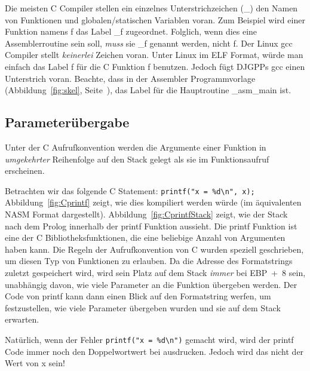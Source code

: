 Die meisten C Compiler stellen ein einzelnes Unterstrichzeichen
({\code \_}) den Namen von Funktionen und globalen/statischen
Variablen voran. Zum Beispiel wird einer Funktion namens {\code f}
das Label {\code \_f} zugeordnet. Folglich, wenn dies eine
Assemblerroutine sein soll, \emph{muss} sie {\code \_f} genannt
werden, nicht {\code f}. Der Linux gcc Compiler 
stellt \emph{keinerlei} Zeichen voran. Unter Linux im ELF Format,
w\"{u}rde man einfach das Label {\code f} f\"{u}r die C Funktion {\code f}
benutzen. Jedoch f\"{u}gt DJGPPs  gcc einen
Unterstrich voran. Beachte, dass in der Assembler Programmvorlage
(Abbildung~\ref{fig:skel}, Seite~\pageref{fig:skel}), das Label f\"{u}r
die Hauptroutine {\code \_asm\_main} ist.

\subsection{Parameter\"{u}bergabe}
Unter der C Aufrufkonvention werden die Argumente einer Funktion in
\emph{umgekehrter} Reihenfolge auf den Stack gelegt als sie im
Funktionsaufruf erscheinen.

Betrachten wir das folgende C Statement: \verb|printf("x = %d\n", x);|
 Abbildung~\ref{fig:Cprintf} zeigt, wie dies
kompiliert werden w\"{u}rde (im \"{a}quivalenten NASM 
Format dargestellt). Abbildung~\ref{fig:CprintfStack} zeigt, wie der
Stack nach dem Prolog  innerhalb der
{\code printf} Funktion aussieht. Die {\code printf} Funktion ist
eine der C Bibliotheksfunktionen, die eine beliebige Anzahl von
Argumenten haben kann. Die Regeln der Aufrufkonvention von C wurden
speziell geschrieben,  um diesen Typ von Funktionen zu erlauben.
Da die Adresse des Formatstrings zuletzt gespeichert wird, wird sein
Platz auf dem Stack \emph{immer} bei {\code EBP~+~8} sein,
unabh\"{a}ngig davon, wie viele Parameter an die Funktion \"{u}bergeben
werden. Der Code von {\code printf} kann dann einen Blick auf den
Formatstring werfen, um festzustellen, wie viele Parameter \"{u}bergeben
wurden und sie auf dem Stack erwarten.

Nat\"{u}rlich, wenn der Fehler \verb|printf("x = %d\n")| gemacht wird,
wird der {\code printf}  Code immer noch den
Doppelwortwert bei {\code [EBP~+~12]} ausdrucken. Jedoch wird das
nicht der Wert von {\code x} sein!

